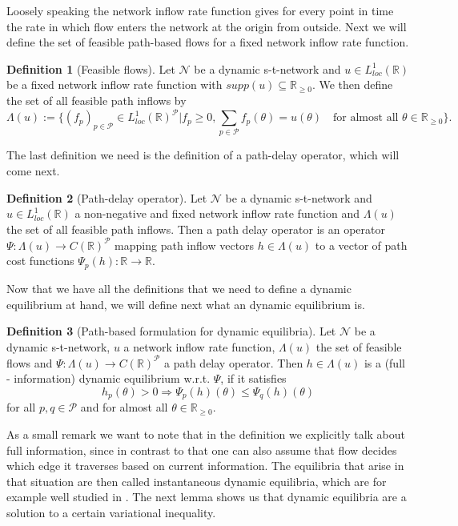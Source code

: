 \documentclass[reqno,openany]{amsbook}
\theoremstyle{definition}
\newtheorem{definition}{Definition}[chapter]
\theoremstyle{plain}
\begin{document}
Loosely speaking the network inflow rate function gives for every point in time the rate in which flow enters the network at the origin from outside. Next we will define the set of feasible path-based flows for a fixed network inflow rate function.

\begin{definition}[Feasible flows]
Let $\mathcal{N}$ be a dynamic s-t-network and $u \in L_{loc}^1(\mathbb{R})$ be a fixed network inflow rate function with $supp(u) \subseteq \mathbb{R}_{\geq 0}$. We then define the set of all feasible path inflows by 
\[ \Lambda(u) := \{ (f_p)_{p \in \mathcal{P}} \in L_{loc}^1(\mathbb{R})^{\mathcal{P}} \vert f_p \geq 0, \sum_{p \in \mathcal{P}} f_p(\theta) = u(\theta) \quad \text{for almost all $\theta \in \mathbb{R}_{\geq 0}$}\}.\]
\end{definition}

The last definition we need is the definition of a path-delay operator, which will come next.

\begin{definition}[Path-delay operator]
Let $\mathcal{N}$ be a dynamic s-t-network and $u \in L_{loc}^1(\mathbb{R})$ a non-negative and fixed network inflow rate function and $\Lambda(u)$ the set of all feasible path inflows. Then a path delay operator is an operator $\Psi: \Lambda(u) \to C(\mathbb{R})^{\mathcal{P}}$ mapping path inflow vectors $h \in \Lambda(u)$ to a vector of path cost functions $\Psi_p(h) :\mathbb{R} \to \mathbb{R}$.
\end{definition}

Now that we have all the definitions that we need to define a dynamic equilibrium at hand, we will define next what an dynamic equilibrium is.

\begin{definition}[Path-based formulation for dynamic equilibria]
Let $\mathcal{N}$ be a dynamic s-t-network, $u$ a network inflow rate function, $\Lambda(u)$ the set of feasible flows and $\Psi: \Lambda(u) \to C(\mathbb{R})^{\mathcal{P}}$ a path delay operator. Then $h \in \Lambda(u)$ is a (full - information) dynamic equilibrium w.r.t. $\Psi$, if it satisfies
\[ h_p(\theta) > 0 \Rightarrow \Psi_p(h)(\theta) \leq \Psi_q(h)(\theta) \]
for all $p, q \in \mathcal{P}$ and for almost all $\theta \in \mathbb{R}_{\geq 0}$.
\end{definition}

As a small remark we want to note that in the definition we explicitly talk about full information, since in contrast to that one can also assume that flow decides which edge it traverses based on current information. The equilibria that arise in that situation are then called instantaneous dynamic equilibria, which are for example well studied in \cite{GRA1}. The next lemma shows us that dynamic equilibria are a solution to a certain variational inequality.
\end{document}
